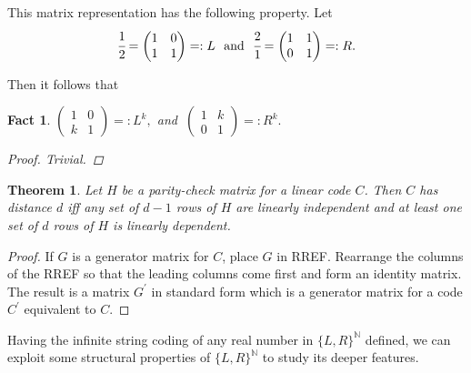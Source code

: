 \documentclass[11pt]{amsart}
\theoremstyle{plain}
\newtheorem{thm}{Theorem}
\newtheorem{fact}{Fact}
\theoremstyle{definition}
\begin{document}
This matrix representation has the following property.  Let 
$$\cfrac{{1}}{{2}}=\begin{pmatrix}
1 &0 \\ 
1 &1 
\end{pmatrix}=:L \ \ \text{and}  \ \ \cfrac{{2}}{{1}}=\begin{pmatrix}
1 &1 \\ 
0 &1 
\end{pmatrix}=:R . $$

Then it follows that 

\begin{fact}
$\begin{pmatrix}
1 &0 \\ 
k &1 
\end{pmatrix}=:L^{k} , $ and 
$\ \begin{pmatrix}
1 &k \\ 
0 &1 
\end{pmatrix}=:R^{k}. $

\begin{proof}  Trivial.
\end{proof}
\end{fact}
\medskip

\begin{thm} \cite{Devaney} \cite{Elaydi} \cite{Apostol} Let $H$ be a parity-check matrix for a linear code $C$. Then $C$ has distance $d$ iff any set of $d-1$ rows of $H$ are linearly independent and at least one set of $d$ rows of $H$ is linearly dependent.
\end{thm}

\begin{proof} If $G$ is a generator matrix for $C$, place $G$ in RREF. Rearrange the columns of the RREF so that the leading columns come first and form an identity matrix. The result is a matrix $G^\prime$ in standard form which is a generator matrix for a code $C^\prime$ equivalent to $C$.
\end{proof}
\medskip

Having the infinite string coding of any real number in $\{L,R\}^{\mathbb N}$ defined, we can exploit some structural properties of 
$\{L,R\}^{\mathbb N}$ to study its deeper features.

\bigskip





\end{document}
